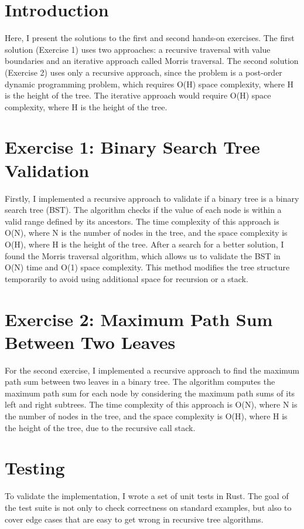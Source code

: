 \documentclass[11pt,a4paper]{article}
\begin{document}
\newpage
\section*{Introduction}
Here, I present the solutions to the first and second hands-on exercises. The first solution (Exercise 1) uses two approaches: a recursive traversal with value boundaries and an iterative approach called Morris traversal. The second solution (Exercise 2) uses only a recursive approach, since the problem is a post-order dynamic programming problem, which requires O(H) space complexity, where H is the height of the tree. The iterative approach would require O(H) space complexity, where H is the height of the tree.
\section*{Exercise 1: Binary Search Tree Validation}
Firstly, I implemented a recursive approach to validate if a binary tree is a binary search tree (BST). The algorithm checks if the value of each node is within a valid range defined by its ancestors. The time complexity of this approach is O(N), where N is the number of nodes in the tree, and the space complexity is O(H), where H is the height of the tree.
After a search for a better solution, I found the Morris traversal algorithm, which allows us to validate the BST in O(N) time and O(1) space complexity. This method modifies the tree structure temporarily to avoid using additional space for recursion or a stack.
\section*{Exercise 2: Maximum Path Sum Between Two Leaves}
For the second exercise, I implemented a recursive approach to find the maximum path sum between two leaves in a binary tree. The algorithm computes the maximum path sum for each node by considering the maximum path sums of its left and right subtrees. The time complexity of this approach is O(N), where N is the number of nodes in the tree, and the space complexity is O(H), where H is the height of the tree, due to the recursive call stack.
\section*{Testing}
To validate the implementation, I wrote a set of unit tests in Rust. The goal of the test suite is not only to check correctness on standard examples, but also to cover edge cases that are easy to get wrong in recursive tree algorithms.
\end{document}

